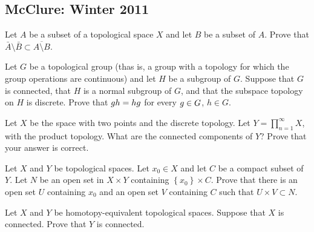 \subsection{McClure: Winter 2011}
\setcounter{exercise}{0}

\begin{problem}
  Let $A$ be a subset of a topological space $X$ and let $B$ be a subset of
  $A$. Prove that $\bar A\setminus\bar B\subset\overline{A\setminus B}$.
\end{problem}
\begin{solution}
\end{solution}

\begin{problem}
  Let $G$ be a topological group (thas is, a group with a topology for
  which the group operations are continuous) and let $H$ be a subgroup of
  $G$. Suppose that $G$ is connected, that $H$ is a normal subgroup of $G$,
  and that the subspace topology on $H$ is discrete. Prove that
  $g h=hg$ for every $g\in G$, $h\in G$.
\end{problem}
\begin{solution}
\end{solution}

\begin{problem}
  Let $X$ be the space with two points and the discrete topology. Let
  $Y=\prod_{n=1}^\infty X$, with the product topology. What are the
  connected components of $Y$? Prove that your answer is correct.
\end{problem}
\begin{solution}
\end{solution}

\begin{problem}
  Let $X$ and $Y$ be topological spaces. Let $x_0\in X$ and let $C$ be a
  compact subset of $Y$. Let $N$ be an open set in $X\times Y$ containing
  $\left\{x_0\right\}\times C$. Prove that there is an open set $U$
  containing $x_0$ and an open set $V$ containing $C$ such that
  $U\times V\subset N$.
\end{problem}
\begin{solution}
\end{solution}

\begin{problem}
  Let $X$ and $Y$ be homotopy-equivalent topological spaces. Suppose that
  $X$ is connected. Prove that $Y$ is connected.
\end{problem}
\begin{solution}
\end{solution}

